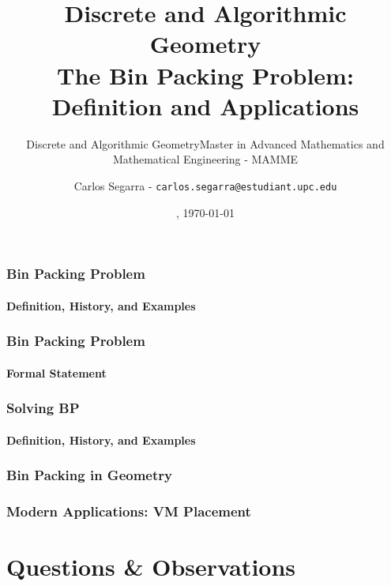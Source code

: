 \documentclass[10pt,    %
    english,            %
    xcolor=table,       %
    envcountsect,        %
    aspectratio=169     %
]{beamer}
\subtitle{Discrete and Algorithmic Geometry} %
\title[The Bin Packing Problem] %
    {\normalsize Discrete and Algorithmic Geometry \\ \Large The Bin Packing Problem: \\ \Large Definition and Applications}
\subtitle{Master in Advanced Mathematics and Mathematical Engineering - MAMME}
\date[\datedayname, \today] %
    {\datedayname, \today}
\author[] %
{Carlos Segarra - \texttt{carlos.segarra@estudiant.upc.edu}}
\begin{document}
\begin{frame}
  \titlepage
\end{frame}

\begin{frame}
    \frametitle{Bin Packing Problem}
    \framesubtitle{Definition, History, and Examples}

\end{frame}

\begin{frame}
    \frametitle{Bin Packing Problem}
    \framesubtitle{Formal Statement}

\end{frame}

\begin{frame}
    \frametitle{Solving BP}
    \framesubtitle{Definition, History, and Examples}

\end{frame}

\begin{frame}
    \frametitle{Bin Packing in Geometry}

\end{frame}

\begin{frame}
    \frametitle{Modern Applications: VM Placement}

\end{frame}


\section{Questions \& Observations}
\sectionframe
\end{document}
